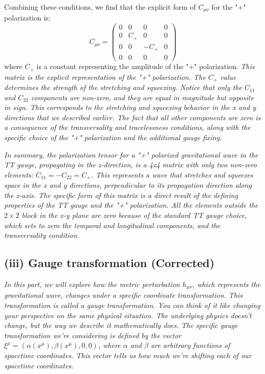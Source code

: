 \documentclass{article}
\begin{document}
Combining these conditions, we find that the explicit form of $C_{\mu \nu}$ for the "+" polarization is:
\begin{equation}
C_{\mu \nu} = \begin{pmatrix}
0 & 0 & 0 & 0 \\
0 & C_{+} & 0 & 0 \\
0 & 0 & -C_{+} & 0 \\
0 & 0 & 0 & 0
\end{pmatrix}
\end{equation}
where $C_{+}$ is a constant representing the amplitude of the "+" polarization. \emph{This matrix is the explicit representation of the "+" polarization. The $C_{+}$ value determines the strength of the stretching and squeezing. Notice that only the $C_{11}$ and $C_{22}$ components are non-zero, and they are equal in magnitude but opposite in sign. This corresponds to the stretching and squeezing behavior in the x and y directions that we described earlier. The fact that all other components are zero is a consequence of the transversality and tracelessness conditions, along with the specific choice of the "+" polarization and the additional gauge fixing.}

\emph{In summary, the polarization tensor for a "+" polarized gravitational wave in the TT gauge, propagating in the z-direction, is a 4x4 matrix with only two non-zero elements: $C_{11} = -C_{22} = C_{+}$. This represents a wave that stretches and squeezes space in the x and y directions, perpendicular to its propagation direction along the z-axis. The specific form of this matrix is a direct result of the defining properties of the TT gauge and the "+" polarization. All the elements outside the $2\times2$ block in the x-y plane are zero because of the standard TT gauge choice, which sets to zero the temporal and longitudinal components, and the transversality condition.}

\subsection*{(iii) Gauge transformation (Corrected)}

\emph{In this part, we will explore how the metric perturbation $h_{\mu\nu}$, which represents the gravitational wave, changes under a specific coordinate transformation. This transformation is called a gauge transformation. You can think of it like changing your perspective on the same physical situation. The underlying physics doesn't change, but the way we describe it mathematically does. The specific gauge transformation we're considering is defined by the vector $\xi^{\mu} = (\alpha(x^{\mu}), \beta(x^{\mu}), 0, 0)$, where $\alpha$ and $\beta$ are arbitrary functions of spacetime coordinates. This vector tells us how much we're shifting each of our spacetime coordinates.}
\end{document}
